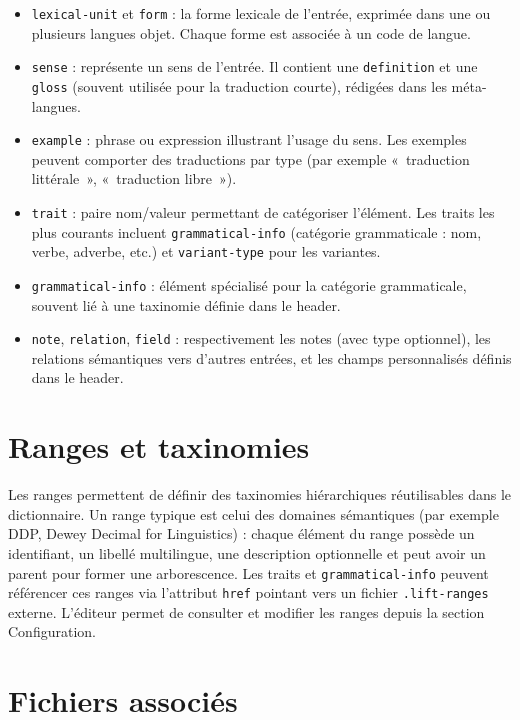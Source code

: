 \documentclass[11pt,twoside,openany]{book}
\begin{document}
\begin{itemize}
\item \texttt{lexical-unit} et \texttt{form} : la forme lexicale de l'entrée, exprimée dans une ou plusieurs langues objet. Chaque forme est associée à un code de langue.
\item \texttt{sense} : représente un sens de l'entrée. Il contient une \texttt{definition} et une \texttt{gloss} (souvent utilisée pour la traduction courte), rédigées dans les méta-langues.
\item \texttt{example} : phrase ou expression illustrant l'usage du sens. Les exemples peuvent comporter des traductions par type (par exemple «~traduction littérale~», «~traduction libre~»).
\item \texttt{trait} : paire nom/valeur permettant de catégoriser l'élément. Les traits les plus courants incluent \texttt{grammatical-info} (catégorie grammaticale : nom, verbe, adverbe, etc.) et \texttt{variant-type} pour les variantes.
\item \texttt{grammatical-info} : élément spécialisé pour la catégorie grammaticale, souvent lié à une taxinomie définie dans le header.
\item \texttt{note}, \texttt{relation}, \texttt{field} : respectivement les notes (avec type optionnel), les relations sémantiques vers d'autres entrées, et les champs personnalisés définis dans le header.
\end{itemize}

\section{Ranges et taxinomies}

Les ranges permettent de définir des taxinomies hiérarchiques réutilisables dans le dictionnaire. Un range typique est celui des domaines sémantiques (par exemple DDP, Dewey Decimal for Linguistics) : chaque élément du range possède un identifiant, un libellé multilingue, une description optionnelle et peut avoir un parent pour former une arborescence. Les traits et \texttt{grammatical-info} peuvent référencer ces ranges via l'attribut \texttt{href} pointant vers un fichier \texttt{.lift-ranges} externe. L'éditeur permet de consulter et modifier les ranges depuis la section Configuration.

\section{Fichiers associés}
\end{document}
